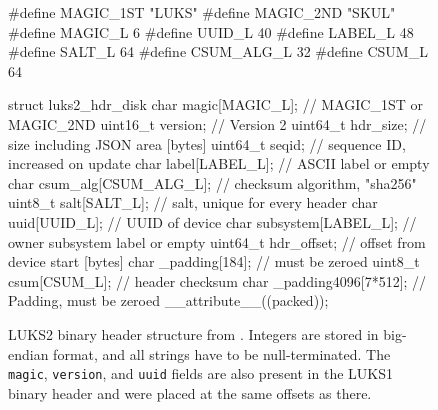 \begin{figure}[htb!]
	\begin{ccode}
#define MAGIC_1ST "LUKS\xba\xbe"
#define MAGIC_2ND "SKUL\xba\xbe"
#define MAGIC_L     6
#define UUID_L     40
#define LABEL_L    48
#define SALT_L     64
#define CSUM_ALG_L 32
#define CSUM_L     64

struct luks2_hdr_disk {
    char     magic[MAGIC_L];       // MAGIC_1ST or MAGIC_2ND
    uint16_t version;              // Version 2
    uint64_t hdr_size;             // size including JSON area [bytes]
    uint64_t seqid;                // sequence ID, increased on update
    char     label[LABEL_L];       // ASCII label or empty
    char     csum_alg[CSUM_ALG_L]; // checksum algorithm, "sha256"
    uint8_t  salt[SALT_L];         // salt, unique for every header
    char     uuid[UUID_L];         // UUID of device
    char     subsystem[LABEL_L];   // owner subsystem label or empty
    uint64_t hdr_offset;           // offset from device start [bytes]
    char    _padding[184];         // must be zeroed
    uint8_t  csum[CSUM_L];         // header checksum
    char    _padding4096[7*512];   // Padding, must be zeroed
} __attribute__((packed));
	\end{ccode}
	\caption[
		LUKS2 binary header structure
	]{
		LUKS2 binary header structure from \cite{Broz2018}. Integers are stored in big-endian format, and all strings have to be null-terminated. The \texttt{magic}, \texttt{version}, and \texttt{uuid} fields are also present in the LUKS1 binary header and were placed at the same offsets as there.
	}
	\label{fig:background.luks2.binhdrstructure}
\end{figure}

